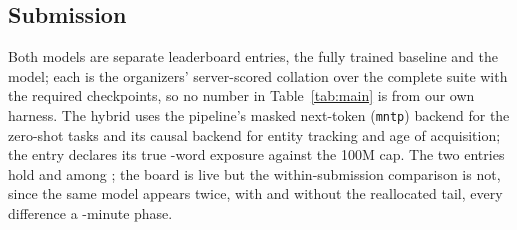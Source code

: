 \subsection{Submission}
\label{sec:submission}
Both models are separate leaderboard entries, the fully trained baseline
and the \MPO{} model; each is the organizers' server-scored collation over
the complete suite with the required checkpoints, so no number in
Table~\ref{tab:main} is from our own harness. The hybrid uses the
pipeline's masked next-token (\texttt{mntp}) backend for the zero-shot
tasks and its causal backend for entity tracking and age of acquisition;
the \MPO{} entry declares its true \rDpoWords{}-word exposure against the
100M cap. The two entries hold \rRankDpo{} and \rRankBase{} among
\rFieldSize{}; the board is live but the within-submission comparison is
not, since the same \rParamsM{} model appears twice, with and without the
reallocated tail, every difference a \rDpoMinutes{}-minute phase.
